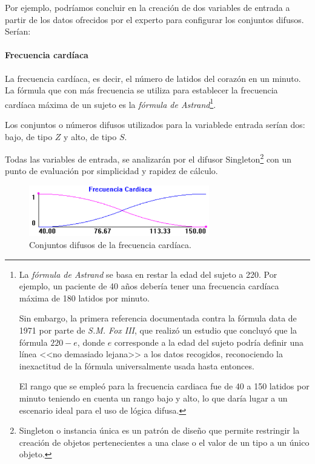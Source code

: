 \documentclass[a4paper, 11pt, titlepage]{article}
\begin{document}
        Por ejemplo, podríamos concluir en la creación de dos variables de entrada a partir de los datos 
        ofrecidos por el experto para configurar los conjuntos difusos. Serían:

        \paragraph{Frecuencia cardíaca} La frecuencia cardíaca, es decir, el número de latidos del corazón 
        en un minuto. La fórmula que con más frecuencia se utiliza para establecer la frecuencia cardíaca 
        máxima de un sujeto es la \textit{fórmula de Astrand}\footnote{
            La \textit{fórmula de Astrand} se basa en restar la edad del sujeto a 220. Por ejemplo, un 
            paciente de 40 años debería tener una frecuencia cardíaca máxima de 180 latidos por minuto.

            Sin embargo, la primera referencia documentada contra la fórmula data de 1971 por parte de 
            \textit{S.M. Fox III}, que realizó un estudio que concluyó que la fórmula $220-e$, donde $e$ 
            corresponde a la edad del sujeto podría definir una línea <<no demasiado lejana>> a los datos 
            recogidos, reconociendo la inexactitud de la fórmula universalmente usada hasta entonces. 
            
            El rango que se empleó para la frecuencia cardiaca fue de 40 a 150 latidos  
            por minuto teniendo en cuenta un rango bajo y alto, lo que daría lugar a un escenario ideal para el 
            uso de lógica difusa.
        }.

        Los conjuntos o números difusos utilizados para la variablede entrada serían dos: bajo, de tipo $Z$ y 
        alto, de tipo $S$. 

        Todas las variables de entrada, se analizarán por el difusor Singleton\footnote{
            Singleton o instancia única es un patrón de diseño que permite restringir la creación de objetos 
            pertenecientes a una clase o el valor de un tipo a un único objeto.
        } con un punto de evaluación por 
        simplicidad y rapidez de cálculo.

        \begin{figure}[htp]
            \centering
            \includegraphics[width=0.7\textwidth]{resources/frecuenciacardiaca.png}
            \caption{Conjuntos difusos de la frecuencia cardíaca.}
            \label{frecuenciacardiaca}
        \end{figure}
    
\end{document}
